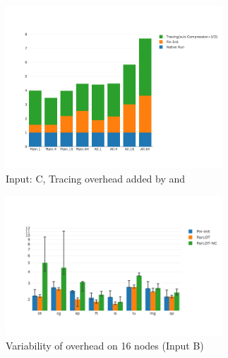\begin{figure}[!t]
\centering
\includegraphics[width=3.2in]{figs.comet.newMed/comet_chartDet_C_woc_byTool_p3_5.png}
\caption{ Input: C, Tracing overhead added by \pininit and \parlotnc}
\label{comet_chartDet_C_woc_byTool_p3_5}
\end{figure}




\begin{figure}[!t]
\centering
\includegraphics[width=3.2in]{figs.comet.newMed/comet_BX2_Main_16_B_p3_5.png}
\caption{ Variability of \parlotm overhead on 16 nodes (Input B)
}
\label{comet_BX2_Main_16_B_p3_5}
\end{figure}

